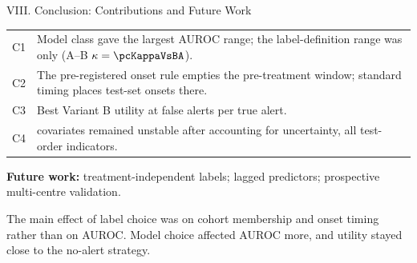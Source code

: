 \begin{frame}{VIII. Conclusion: Contributions and Future Work}
\begin{center}\renewcommand{\arraystretch}{1.2}\small
\begin{tabular}{cp{11.6cm}}
\toprule
C1 & Model class gave the largest AUROC range; the label-definition range
     was only \pcSpreadLabel{} (A--B $\kappa = \pcKappaVsBA$). \\
C2 & The pre-registered onset rule empties the pre-treatment window;
     standard timing places \pcPreTreatOnsetsVarF{} test-set onsets there. \\
C3 & Best Variant B utility \pcUtilityMaxGbtB{} at
     \pcUtilityOptBurdenGbtB{} false alerts per true alert. \\
C4 & \pcHTwoNRobust{} covariates remained unstable after accounting for
     uncertainty, all test-order indicators. \\
\bottomrule
\end{tabular}
\end{center}

\vspace{2pt}
{\scriptsize\textbf{Future work:} treatment-independent labels; lagged
predictors; prospective multi-centre validation.\par}

\vspace{2pt}
\begin{block}{}
  \centering\small The main effect of label choice was on cohort
  membership and onset timing rather than on AUROC. Model choice affected
  AUROC more, and utility stayed close to the no-alert strategy.
\end{block}

\end{frame}
